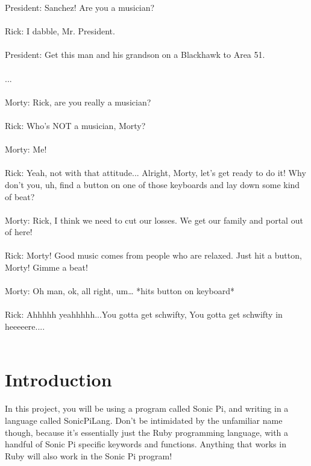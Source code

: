 \documentclass{42-en}
\begin{document}
\begin{scriptsize}
{		President: Sanchez! Are you a musician?\\\\
		Rick: I dabble, Mr. President.\\\\
		President: Get this man and his grandson on a Blackhawk to Area 51.\\
		\\...\\\\
		Morty: Rick, are you really a musician?\\\\
		Rick: Who’s NOT a musician, Morty?\\\\
		Morty: Me!\\\\
		Rick: Yeah, not with that attitude... Alright, Morty, let’s get ready to do it! Why don’t you, uh, find a button on one of those keyboards and lay down some kind of beat?\\\\
		Morty: Rick, I think we need to cut our losses. We get our family and portal out of here!\\\\
		Rick: Morty! Good music comes from people who are relaxed. Just hit a button, Morty! Gimme a beat!\\\\
		Morty: Oh man, ok, all right, um… *hits button on keyboard*\\\\
		Rick: Ahhhhh yeahhhhh...You gotta get schwifty, You gotta get schwifty in heeeeere....\\\\}
	\end{scriptsize}

\chapter{Introduction}
	In this project, you will be using a program called Sonic Pi, and writing in a language called SonicPiLang. Don't be intimidated by the unfamiliar name though, because it's essentially just the Ruby programming language, with a handful of Sonic Pi specific keywords and functions. Anything that works in Ruby will also work in the Sonic Pi program!\\
\end{document}
